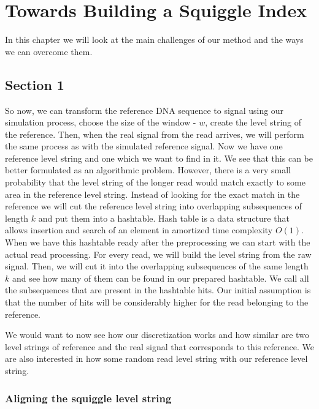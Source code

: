 \chapter{Towards Building a Squiggle Index}

\label{kap:methAdjust} %

In this chapter we will look at the main challenges of our method and the ways
we can overcome them.

\section{Section 1}

So now, we can transform the reference DNA sequence to signal using our simulation
process, choose the size of the window - $w$, create the level string of the reference.
Then, when the real signal from the read arrives, we will perform the same process
as with the simulated reference signal. Now we have one reference level string and
one which we want to find in it. We see that this can be better formulated as an
algorithmic problem. However, there is a very small probability that the level string
of the longer read would match exactly to some area in the reference level string.
Instead of looking for the exact match in the reference we will cut the reference
level string into overlapping subsequences of length $k$ and put them into a hashtable.
Hash table is a data structure that allows insertion and search of an element in
amortized time complexity $O(1)$. When we have this hashtable ready after the
preprocessing we can start with the actual read processing. For every read, we will
build the level string from the raw signal. Then, we will cut it into the overlapping
subsequences of the same length $k$ and see how many of them can be found in our
prepared hashtable. We call all the subsequences that are present in the hashtable
hits. Our initial assumption is that the number of hits will be considerably higher
for the read belonging to the reference.

We would want to now see how our discretization works and how similar are two level
strings of reference and the real signal that corresponds to this reference. We are
also interested in how some random read level string with our reference level string.

\subsection{Aligning the squiggle level string}

